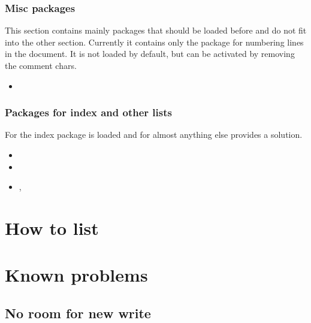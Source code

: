 
\subsection{Misc packages}
This section contains mainly packages that should be loaded before  and do not fit into the other section.
Currently it contains only the package  for numbering lines
in the document. It is not loaded by default, but can be activated by removing the comment chars.

\begin{itemize}[noitemsep]
\item {}
\end{itemize}


\subsection{Packages for index and other lists}
For the index package  is loaded and for almost anything else  provides a solution.

\begin{itemize}[noitemsep]
\item {}
\item {}
\item {}, 
\end{itemize}



\chapter{How to list}

\chapter{Known problems}

\section{No room for new write}
\label{sec:problems:write}